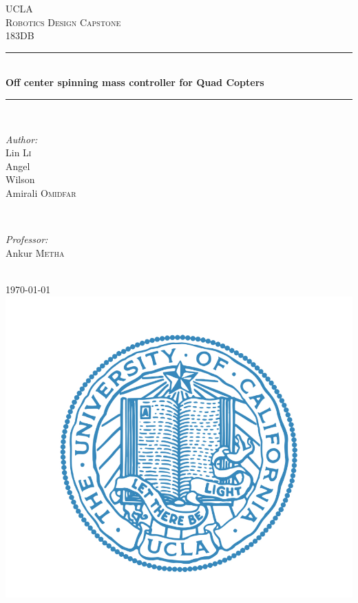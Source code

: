 \begin{titlepage}
\newcommand{\HRule}{\rule{\linewidth}{0.5mm}} %
\center %
\textsc{\LARGE UCLA }\\[1.5cm] %
\textsc{\Large Robotics Design Capstone}\\[0.5cm] %
\textsc{\large 183DB }\\[0.5cm] %
\HRule \\[0.4cm]
{ \huge \bfseries Off center spinning mass controller for Quad Copters}\\[0.4cm] %
\HRule \\[1.5cm]
\begin{minipage}{0.4\textwidth}
\begin{flushleft} \large
\emph{Author:}\\
Lin \textsc{Li} %
\\
Angel \textsc{} %
\\
Wilson \textsc{} %
\\
Amirali \textsc{Omidfar} %
\end{flushleft}
\end{minipage}
~
\begin{minipage}{0.4\textwidth}
\begin{flushright} \large
\emph{Professor:} \\
Ankur \textsc{Metha} %
\end{flushright}
\end{minipage}\\[2cm]
{\large \today}\\[2cm] %
\includegraphics[scale=0.2]{UCLA_Logo.png}\\[1cm] %
\vfill %
\end{titlepage}
